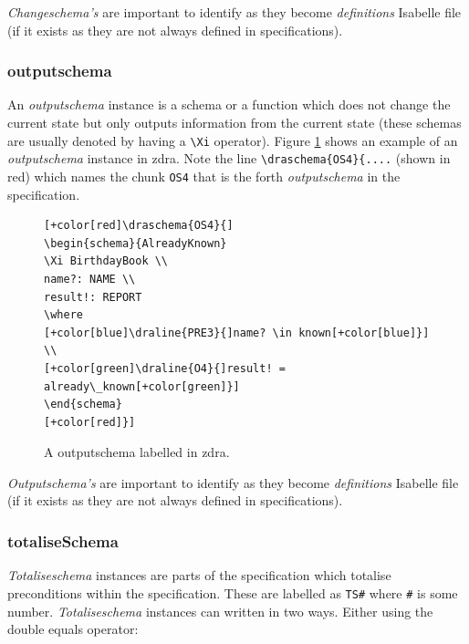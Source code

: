 \emph{Changeschema's} are important to identify as they become \emph{definitions}
Isabelle file (if it exists as they are not always defined in specifications).

\subsubsection{outputschema}

An \emph{outputschema} instance is a schema or a function which does not change
the current state but only outputs information from the current state (these
schemas are usually denoted by having a \verb|\Xi| operator). Figure
\ref{fig:exampleofos} shows an example of an \emph{outputschema} instance in
\gls{zdra}. Note the line \verb|\draschema{OS4}{....| (shown in red) which names
the chunk \verb|OS4| that is the forth \emph{outputschema} in the specification.

\begin{figure}[H]
\centering
\begin{footnotesize}
\begin{BVerbatim}[commandchars=+\[\]]
[+color[red]\draschema{OS4}{]
\begin{schema}{AlreadyKnown}
\Xi BirthdayBook \\
name?: NAME \\
result!: REPORT
\where
[+color[blue]\draline{PRE3}{]name? \in known[+color[blue]}] \\
[+color[green]\draline{O4}{]result! = already\_known[+color[green]}]
\end{schema}
[+color[red]}]
\end{BVerbatim}
\end{footnotesize}
\caption{\label{fig:exampleofos} A outputschema labelled in \gls{zdra}.}
\end{figure}

\emph{Outputschema's} are important to identify as they become \emph{definitions}
Isabelle file (if it exists as they are not always defined in specifications).

\subsubsection{totaliseSchema}

\emph{Totaliseschema} instances are parts of the specification which totalise
preconditions within the specification. These are labelled as
\verb|TS#| where \verb|#| is some number. \emph{Totaliseschema} instances can written
in two ways. Either using the double equals operator:

